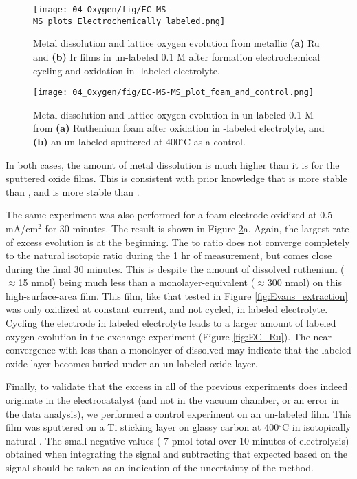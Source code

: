 \begin{figure}[t]
	\texttt{[image: 04\_Oxygen/fig/EC-MS-MS\_plots\_Electrochemically\_labeled.png]}
	\caption{Metal dissolution and lattice oxygen evolution from metallic \textbf{(a)} Ru and \textbf{(b)} Ir films in un-labeled 0.1 M  after formation electrochemical cycling and oxidation in -labeled electrolyte.
	}
	\label{fig:EC-MS-MS_EC}
\end{figure}
\begin{figure}[t]
	\texttt{[image: 04\_Oxygen/fig/EC-MS-MS\_plot\_foam\_and\_control.png]}
	\caption{Metal dissolution and lattice oxygen evolution in un-labeled 0.1 M  from \textbf{(a)} Ruthenium foam after oxidation in -labeled electrolyte, and \textbf{(b)} an un-labeled  sputtered at 400$^\circ$C as a control.
	}
	\label{fig:EC-MS-MS_foam}
\end{figure}

In both cases, the amount of metal dissolution is much higher than it is for the sputtered oxide films. This is consistent with prior knowledge that  is more stable than \cite{Roy2018, Cherevko2016}, and  is more stable than \cite{Cherevko2016}. 

The same experiment was also performed for a  foam electrode oxidized at 0.5 mA/cm$^2$ for 30 minutes. The result is shown in Figure \ref{fig:EC-MS-MS_foam}a. Again, the largest rate of excess  evolution is at the beginning. The  to  ratio does not converge completely to the natural isotopic ratio during the 1 hr of measurement, but comes close during the final 30 minutes. This is despite the amount of dissolved ruthenium ($\approx$15 nmol) being much less than a monolayer-equivalent ($\approx$300 nmol) on this high-surface-area film. This film, like that tested in Figure \ref{fig:Evans_extraction} was only oxidized at constant current, and not cycled, in labeled electrolyte. Cycling the electrode in labeled electrolyte leads to a larger amount of labeled oxygen evolution in the exchange experiment (Figure \ref{fig:EC_Ru}). The near-convergence with less than a monolayer of  dissolved may indicate that the labeled oxide layer becomes buried under an un-labeled oxide layer.

Finally, to validate that the excess  in all of the previous experiments does indeed originate in the electrocatalyst (and not in the vacuum chamber, or an error in the data analysis), we performed a control experiment on an un-labeled  film. This film was sputtered on a Ti sticking layer on glassy carbon at 400$^\circ$C in isotopically natural . The small negative values (-7 pmol total over 10 minutes of electrolysis) obtained when integrating the  signal and subtracting that expected based on the  signal should be taken as an indication of the uncertainty of the method.

